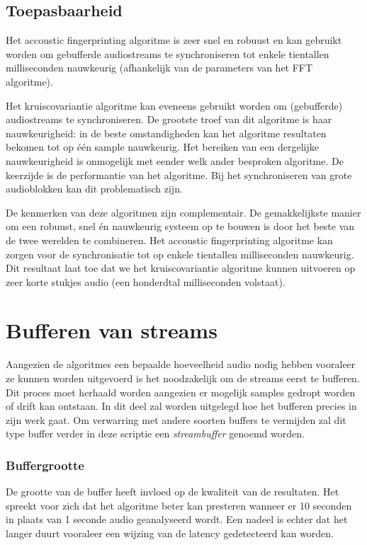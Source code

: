 \subsection{Toepasbaarheid}
\label{toepasbaarheid}

Het accoustic fingerprinting algoritme is zeer snel en robuust en kan gebruikt worden om gebufferde audiostreams te synchroniseren tot enkele tientallen milliseconden nauwkeurig (afhankelijk van de parameters van het FFT algoritme).

Het kruiscovariantie algoritme kan eveneens gebruikt worden om (gebufferde) audiostreams te synchroniseren. De grootste troef van dit algoritme is haar nauwkeurigheid: in de beste omstandigheden kan het algoritme resultaten bekomen tot op één sample nauwkeurig. Het bereiken van een dergelijke nauwkeurigheid is onmogelijk met eender welk ander besproken algoritme. De keerzijde is de performantie van het algoritme. Bij het synchroniseren van grote audioblokken kan dit problematisch zijn.

De kenmerken van deze algoritmen zijn complementair. De gemakkelijkste manier om een robuust, snel én nauwkeurig systeem op te bouwen is door het beste van de twee werelden te combineren. Het accoustic fingerprinting algoritme kan zorgen voor de synchronisatie tot op enkele tientallen milliseconden nauwkeurig. Dit resultaat laat toe dat we het kruiscovariantie algoritme kunnen uitvoeren op zeer korte stukjes audio (een honderdtal milliseconden volstaat).

\section{Bufferen van streams}
\label{streambuffers}

Aangezien de algoritmes een bepaalde hoeveelheid audio nodig hebben vooraleer ze kunnen worden uitgevoerd is het noodzakelijk om de streams eerst te bufferen. Dit proces moet herhaald worden aangezien er mogelijk samples gedropt worden of drift kan ontstaan. In dit deel zal worden uitgelegd hoe het bufferen precies in zijn werk gaat. Om verwarring met andere soorten buffers te vermijden zal dit type buffer verder in deze scriptie een \textit{streambuffer} genoemd worden.

\subsubsection{Buffergrootte}

De grootte van de buffer heeft invloed op de kwaliteit van de resultaten. Het spreekt voor zich dat het algoritme beter kan presteren wanneer er 10 seconden in plaats van 1 seconde audio geanalyseerd wordt. Een nadeel is echter dat het langer duurt vooraleer een wijzing van de latency gedetecteerd kan worden. 

